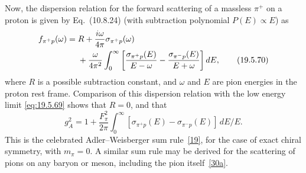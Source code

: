Now, the dispersion relation for the forward scattering of a massless $\pi^+$ on a proton is given by Eq.~(10.8.24) (with subtraction polynomial $P(E)\propto E$) as
\begin{align}
f_{\pi^+p}(\omega)
={}&R+\frac{i\omega}{4\pi}\sigma_{\pi^+p}(\omega)
\notag\\
&+\frac{\omega}{4\pi^2}\int_0^\infty
\left[
\frac{\sigma_{\pi^+p}(E)}{E-\omega}
-\frac{\sigma_{\pi^-p}(E)}{E+\omega}
\right]dE,
\tag{19.5.70}\label{eq:19.5.70}
\end{align}
where $R$ is a possible subtraction constant, and $\omega$ and $E$ are pion energies in the proton rest frame. Comparison of this dispersion relation with the low energy limit \eqref{eq:19.5.69} shows that $R=0$, and that
\begin{equation}
g_A^2
=1+\frac{F_\pi^2}{2\pi}\int_0^\infty
[\sigma_{\pi^+p}(E)-\sigma_{\pi^-p}(E)]\,dE/E.
\tag{19.5.71}\label{eq:19.5.71}
\end{equation}
This is the celebrated Adler--Weisberger sum rule~\hyperref[ch19-ref-19]{[19]}, for the case of exact chiral symmetry, with $m_\pi=0$. A similar sum rule may be derived for the scattering of pions on any baryon or meson, including the pion itself~\hyperref[ch19-ref-30a]{[30a]}.
